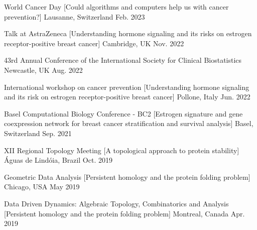 
\begin{cvhonors}

\cvhonor 
  {World Cancer Day} %
  [Could algorithms and computers help us with cancer prevention?] %
  {Lausanne, Switzerland} %
  {Feb. 2023} %

\cvhonor 
  {Talk at AstraZeneca} %
  [Understanding hormone signaling and its risks on estrogen receptor-positive breast cancer] %
  {Cambridge, UK} %
  {Nov. 2022} %


\cvhonor
  {43rd Annual Conference of the International Society for Clinical Biostatistics} %
  {Newcastle, UK} %
  {Aug. 2022} %

\cvhonor
  {International workshop on cancer prevention} %
  [Understanding hormone signaling and its risk on estrogen receptor-positive breast cancer] %
  {Pollone, Italy} %
  {Jun. 2022} %

\cvhonor
  {Basel Computational Biology Conference - BC2} %
  [Estrogen signature and gene coexpression network for breast cancer stratification and survival analysis] %
  {Basel, Switzerland} %
  {Sep. 2021} %


\cvhonor
  {XII Regional Topology Meeting} %
  [A topological approach to protein stability] %
  {Águas de Lindóia, Brazil} %
  {Oct. 2019} %


\cvhonor
  {Geometric Data Analysis} %
  [Persistent homology and the protein folding problem] %
  {Chicago, USA} %
  {May 2019} %

\cvhonor
  {Data Driven Dynamics: Algebraic Topology, Combinatorics and Analysis} %
  [Persistent homology and the protein folding problem] %
  {Montreal, Canada} %
  {Apr. 2019} %


\end{cvhonors}
